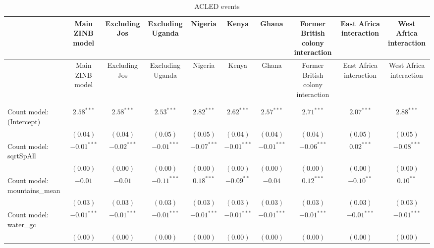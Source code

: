 
\begin{center}
\begin{longtable}{l c c c c c c c c c}
\toprule
 & Main ZINB model & Excluding Jos & Excluding Uganda & Nigeria & Kenya & Ghana & Former British colony interaction & East Africa
	    interaction & West Africa interaction \\
\midrule
\endfirsthead
\toprule
 & Main ZINB model & Excluding Jos & Excluding Uganda & Nigeria & Kenya & Ghana & Former British colony interaction & East Africa
	    interaction & West Africa interaction \\
\midrule
\endhead
\bottomrule
\endfoot
\bottomrule
\multicolumn{10}{l}{\scriptsize{$^{***}p<0.001$; $^{**}p<0.01$; $^{*}p<0.05$; $^{\cdot}p<0.1$}}\\
\caption{ACLED
	       events}
\label{zacledev}
\endlastfoot \\
Count model: (Intercept)       & $2.58^{***}$   & $2.58^{***}$   & $2.53^{***}$  & $2.82^{***}$  & $2.62^{***}$  & $2.57^{***}$    & $2.71^{***}$  & $2.07^{***}$  & $2.88^{***}$    \\
                               & $(0.04)$       & $(0.04)$       & $(0.05)$      & $(0.05)$      & $(0.04)$      & $(0.04)$        & $(0.04)$      & $(0.05)$      & $(0.05)$        \\
Count model: sqrtSpAll         & $-0.01^{***}$  & $-0.02^{***}$  & $-0.01^{***}$ & $-0.07^{***}$ & $-0.01^{***}$ & $-0.01^{***}$   & $-0.06^{***}$ & $0.02^{***}$  & $-0.08^{***}$   \\
                               & $(0.00)$       & $(0.00)$       & $(0.00)$      & $(0.00)$      & $(0.00)$      & $(0.00)$        & $(0.00)$      & $(0.00)$      & $(0.00)$        \\
Count model: mountains\_mean   & $-0.01$        & $-0.01$        & $-0.11^{***}$ & $0.18^{***}$  & $-0.09^{**}$  & $-0.04$         & $0.12^{***}$  & $-0.10^{**}$  & $0.10^{**}$     \\
                               & $(0.03)$       & $(0.03)$       & $(0.03)$      & $(0.03)$      & $(0.03)$      & $(0.03)$        & $(0.03)$      & $(0.03)$      & $(0.03)$        \\
Count model: water\_gc         & $-0.01^{***}$  & $-0.01^{***}$  & $-0.01^{***}$ & $-0.01^{***}$ & $-0.01^{***}$ & $-0.01^{***}$   & $-0.01^{***}$ & $-0.01^{***}$ & $-0.01^{***}$   \\
                               & $(0.00)$       & $(0.00)$       & $(0.00)$      & $(0.00)$      & $(0.00)$      & $(0.00)$        & $(0.00)$      & $(0.00)$      & $(0.00)$        \\

\end{longtable}
\end{center}
